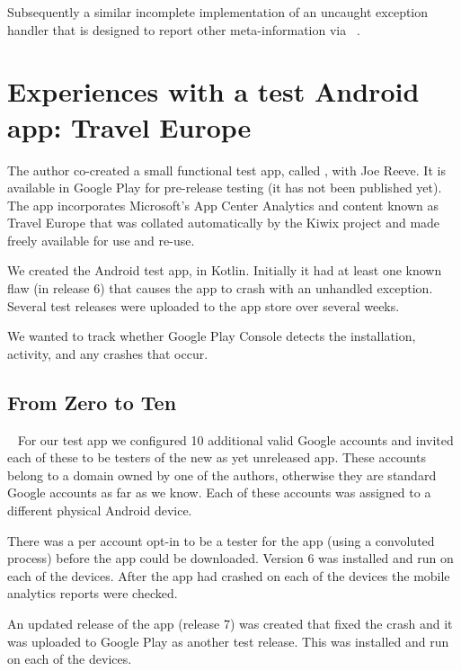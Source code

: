 Subsequently a similar incomplete implementation of an uncaught exception handler that is designed to report other meta-information via ~.


\section{Experiences with a test Android app: Travel Europe}
The author co-created a small functional test app, called , with Joe Reeve. It is available in Google Play for pre-release testing (it has not been published yet). The app incorporates Microsoft's App Center Analytics and content known as Travel Europe that was collated automatically by the Kiwix project and made freely available for use and re-use.

We created the Android test app, in Kotlin. Initially it had at least one known flaw (in release 6) that causes the app to crash with an unhandled exception. Several test releases were uploaded to the app store over several weeks.

We wanted to track whether Google Play Console detects the installation, activity, and any crashes that occur.

\subsection{From Zero to Ten}~\label{appendix-from-zero-to-ten-topic}
For our test app we configured 10 additional valid Google accounts and invited each of these to be testers of the new as yet unreleased app. These accounts belong to a domain owned by one of the authors, otherwise they are standard Google accounts as far as we know. Each of these accounts was assigned to a different physical Android device.

There was a per account opt-in to be a tester for the app (using a convoluted process) before the app could be downloaded. Version 6 was installed and run on each of the devices. After the app had crashed on each of the devices the mobile analytics reports were checked.

An updated release of the app (release 7) was created that fixed the crash and it was uploaded to Google Play as another test release. This was installed and run on each of the devices.

